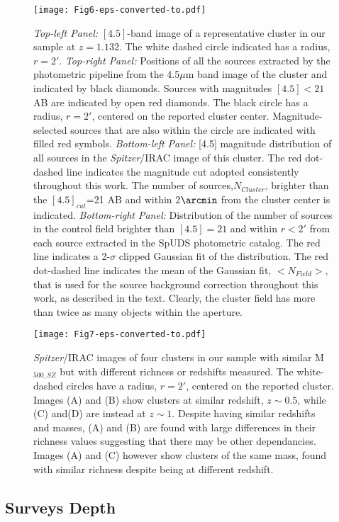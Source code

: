 \documentclass[apj,twocolumn]{emulateapj}
\begin{document}
{\begin{figure*}[h!]
\texttt{[image: Fig6-eps-converted-to.pdf]}
\caption{{\it Top-left Panel:} $[4.5]$-band image of a representative cluster in our sample at $z=1.132$. The white dashed circle indicated has a radius, $r=2'$. {\it Top-right Panel:} Positions of all the sources extracted by the photometric pipeline from the 4.5$\mu$m band image of the cluster and indicated by black diamonds. Sources with magnitudes $[4.5]< 21$ AB are indicated by open red diamonds. The black circle has a radius, $r=2'$, centered on the reported cluster center. Magnitude-selected sources that are also within the circle are indicated with filled red symbols. {\it Bottom-left Panel:} [4.5] magnitude distribution of all sources in the {\it Spitzer}/IRAC image of this cluster. The  red dot-dashed line indicates the magnitude cut adopted consistently throughout this work. The number of sources,$N_{Cluster}$, brighter than the $[4.5]_{cut}$=21 AB and within 2$\arcmin$ from the cluster center is indicated.  {\it Bottom-right Panel:} Distribution of the number of sources in the control field brighter than $[4.5]= 21$ and within $r<2'$ from each source extracted in the SpUDS photometric catalog. The red line indicates a 2-$\sigma$ clipped Gaussian fit of the distribution. The red dot-dashed line indicates the mean of the Gaussian fit, $<N_{Field}>$, that is used for the source background correction throughout this work, as described in the text. Clearly, the cluster field has more than twice
as many objects within the aperture.}
\label{method}
\end{figure*}

\begin{figure}[t!]
\texttt{[image: Fig7-eps-converted-to.pdf]}
\caption{ {\it Spitzer}/IRAC images of four clusters in our sample with similar M$_{500,SZ}$ but with different richness or redshifts measured. The white-dashed circles have a radius, $r=2'$, centered on the reported cluster. Images (A) and (B) show clusters at similar redshift, $z\sim 0.5$, while (C) and(D) are instead at  $z\sim 1$. Despite having similar redshifts and masses, (A) and (B) are found with large differences in their richness values suggesting that there may be other dependancies. Images (A) and (C) however show clusters of the same mass, found with similar richness despite being at different redshift.}
\label{Panel_method}
\end{figure}

\subsection{Surveys Depth}

}
\end{document}
